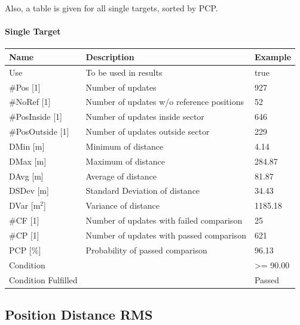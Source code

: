 Also, a table is given for all single targets, sorted by PCP.

\paragraph{Single Target}

\begin{center}
 \begin{table}[H]
  \begin{tabularx}{\textwidth}{ | l | X |  l | }
    \hline
    \textbf{Name} & \textbf{Description} & \textbf{Example} \\ \hline
    Use & To be used in results & true \\ \hline
    \#Pos [1] & Number of updates & 927 \\ \hline
    \#NoRef [1] & Number of updates w/o reference positions & 52 \\ \hline
    \#PosInside [1] & Number of updates inside sector & 646 \\ \hline
    \#PosOutside [1] & Number of updates outside sector & 229 \\ \hline
    DMin [m] & Minimum of distance & 4.14 \\ \hline
    DMax [m] & Maximum of distance & 284.87 \\ \hline
    DAvg [m] & Average of distance & 81.87 \\ \hline
    DSDev [m] & Standard Deviation of distance & 34.43 \\ \hline
    DVar [m$^2$] & Variance of distance & 1185.18 \\ \hline
    \#CF [1] & Number of updates with failed comparison & 25 \\ \hline
    \#CP [1] & Number of updates with  passed comparison & 621 \\ \hline
    PCP [\%] & Probability of passed comparison & 96.13 \\ \hline
    Condition &  & >= 90.00 \\ \hline
    Condition Fulfilled &  & Passed \\ \hline
\end{tabularx}
\end{table}
\end{center}

\subsection{Position Distance RMS}
\label{sec:eval_req_pos_distance_rms} 

